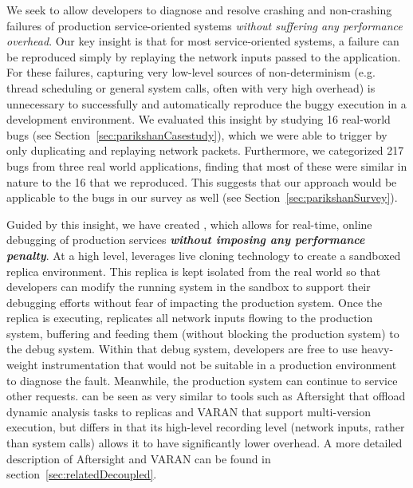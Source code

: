 We seek to allow developers to diagnose and resolve crashing and non-crashing failures of production service-oriented systems \emph{without suffering any performance overhead}.
Our key insight is that for most service-oriented systems, a failure can be reproduced simply by replaying the network inputs passed to the application.
For these failures, capturing very low-level sources of non-determinism (e.g. thread scheduling or general system calls, often with very high overhead) is unnecessary to successfully and automatically reproduce the buggy execution in a development environment.
We evaluated this insight by studying 16 real-world bugs (see Section~\ref{sec:parikshanCasestudy}), which we were able to trigger by only duplicating and replaying network packets.
Furthermore, we categorized 217 bugs from three real world applications, finding that most of these were similar in nature to the 16 that we reproduced. 
This suggests that our approach would be applicable to the bugs in our survey as well (see Section~\ref{sec:parikshanSurvey}).


Guided by this insight, we have created \parikshan, which allows for real-time, online debugging of production services \textbf{\emph{without imposing any performance penalty}}.
At a high level, \parikshan leverages live cloning technology to create a sandboxed replica environment.
This replica is kept isolated from the real world so that developers can modify the running system in the sandbox to support their debugging efforts without fear of impacting the production system.
Once the replica is executing, \parikshan replicates all network inputs flowing to the production system, buffering and feeding them (without blocking the production system) to the debug system.
Within that debug system, developers are free to use heavy-weight instrumentation that would not be suitable in a production environment to diagnose the fault.
Meanwhile, the production system can continue to service other requests.
\parikshan can be seen as very similar to tools such as Aftersight \cite{aftersight} that offload dynamic analysis tasks to replicas and VARAN \cite{Hosek:2015:VUE:2694344.2694390} that support multi-version execution, but differs in that its high-level recording level (network inputs, rather than system calls) allows it to have significantly lower overhead. A more detailed description of Aftersight and VARAN can be found in section~\ref{sec:relatedDecoupled}.


